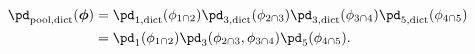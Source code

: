 \begin{equation}
  \begin{aligned}
    \pd_{\text{pool,dict}}(\boldsymbol{\phi})
    &= \pd_{1, \text{dict}}(\phi_{1 \cap 2})
      \pd_{3, \text{dict}}(\phi_{2 \cap 3})
      \pd_{3, \text{dict}}(\phi_{3 \cap 4})
      \pd_{5, \text{dict}}(\phi_{4 \cap 5}) \\
    &= \pd_{1}(\phi_{1 \cap 2})
      \pd_{3}(\phi_{2 \cap 3}, \phi_{3 \cap 4})
      \pd_{5}(\phi_{4 \cap 5}).
  \end{aligned}
  \label{eqn:dictatorial-def-two-example-one}
\end{equation}